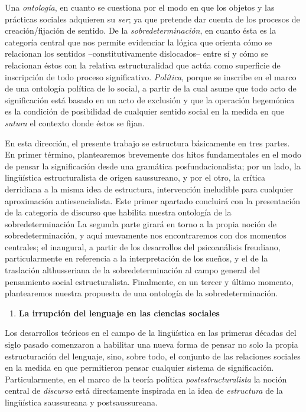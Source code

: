 \documentclass{book}
\begin{document}
Una \emph{ontología}, en cuanto se cuestiona por el modo en que los
objetos y las prácticas sociales adquieren su \emph{ser}; ya que
pretende dar cuenta de los procesos de creación/fijación de sentido. De
la \emph{sobredeterminación}, en cuanto ésta es la categoría central que
nos permite evidenciar la lógica que orienta cómo se relacionan los
sentidos --constitutivamente dislocados-- entre sí y cómo se relacionan
éstos con la relativa estructuralidad que actúa como superficie de
inscripción de todo proceso significativo. \emph{Política}, porque se
inscribe en el marco de una ontología política de lo social, a partir de
la cual asume que todo acto de significación está basado en un acto de
exclusión y que la operación hegemónica es la condición de posibilidad
de cualquier sentido social en la medida en que \emph{sutura} el
contexto donde éstos se fijan.

En esta dirección, el presente trabajo se estructura básicamente en tres
partes. En primer término, plantearemos brevemente dos hitos
fundamentales en el modo de pensar la significación desde una gramática
posfundacionalista; por un lado, la lingüística estructuralista de
origen saussureano, y por el otro, la crítica derridiana a la misma idea
de estructura, intervención ineludible para cualquier aproximación
antiesencialista. Este primer apartado concluirá con la presentación de
la categoría de discurso que habilita nuestra ontología de la
sobredeterminación La segunda parte girará en torno a la propia noción
de sobredeterminación, y aquí nuevamente nos encontraremos con dos
momentos centrales; el inaugural, a partir de los desarrollos del
psicoanálisis freudiano, particularmente en referencia a la
interpretación de los sueños, y el de la traslación althusseriana de la
sobredeterminación al campo general del pensamiento social
estructuralista. Finalmente, en un tercer y último momento, plantearemos
nuestra propuesta de una ontología de la sobredeterminación.

\begin{enumerate}
\def\labelenumi{\arabic{enumi}.}
\setcounter{enumi}{1}
\item
  \textbf{La irrupción del lenguaje en las ciencias sociales}
\end{enumerate}

Los desarrollos teóricos en el campo de la lingüística en las primeras
décadas del siglo pasado comenzaron a habilitar una nueva forma de
pensar no solo la propia estructuración del lenguaje, sino, sobre todo,
el conjunto de las relaciones sociales en la medida en que permitieron
pensar cualquier sistema de significación. Particularmente, en el marco
de la teoría política \emph{postestructuralista} la noción central de
\emph{discurso} está directamente inspirada en la idea de
\emph{estructura} de la lingüística saussureana y postsaussureana.
\end{document}
